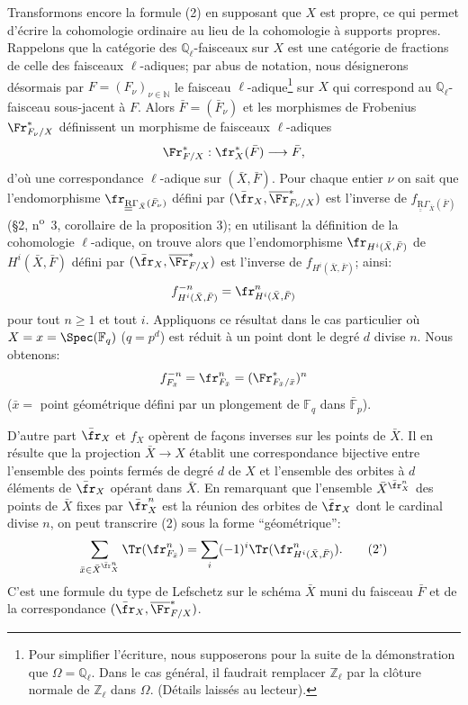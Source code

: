Transformons encore la formule (2) en supposant que $X$ est propre, ce qui permet d'écrire la cohomologie ordinaire au lieu de la cohomologie à supports propres. Rappelons que la catégorie des $\mathbb{Q}_\ell$-faisceaux sur $X$ est une catégorie de fractions de celle des faisceaux $\ell$-adiques; par abus de notation, nous désignerons désormais par $F=(F_\nu)_{\nu\in\mathbb{N}}$ le faisceau $\ell$-adique\footnote{Pour simplifier l'écriture, nous supposerons pour la suite de la démonstration que $\Omega=\mathbb{Q}_\ell$. Dans le cas général, il faudrait remplacer $\mathbb{Z}_\ell$ par la clôture normale de $\mathbb{Z}_\ell$ dans $\Omega$. (Détails laissés au lecteur).} sur $X$ qui correspond au $\mathbb{Q}_\ell$-faisceau sous-jacent à $F$. Alors $\bar F=(\bar F_\nu)$ et les morphismes de Frobenius $\Fr^*_{F_\nu/X}$ définissent un morphisme de faisceaux $\ell$-adiques
\[
\Fr^*_{F/X}:\fr_X^*(\bar F)\longrightarrow\bar F,
\]
d'où une correspondance $\ell$-adique sur $(\bar X,\bar F)$. Pour chaque entier $\nu$ on sait que l'endomorphisme $\fr_{\underline{\underline{\mathrm{R}}}\Gamma_{\bar X}(\bar F_\nu)}$ défini par $(\bar{\fr}_X,\overline{\Fr}^*_{F_\nu/X})$ est l'inverse de $f_{\underline{\underline{\mathrm{R}}}\Gamma_{\bar X}(\bar F)}$ (§2, n\textsuperscript{o}~3, corollaire de la proposition 3); en utilisant la définition de la cohomologie $\ell$-adique, on trouve alors que l'endomorphisme $\fr_{H^i(\bar X,\bar F)}$ de $H^i(\bar X,\bar F)$ défini par $(\bar{\fr}_X,\overline{\Fr}^*_{F/X})$ est l'inverse de $f_{H^i(\bar X,\bar F)}$; ainsi:
\[
f^{-n}_{H^i(\bar X,\bar F)}=\fr^n_{H^i(\bar X,\bar F)}
\]
pour tout $n\ge1$ et tout $i$.
Appliquons ce résultat dans le cas particulier où $X=x=\Spec(\mathbb{F}_q)$ ($q=p^d$) est réduit à un point dont le degré $d$ divise $n$. Nous obtenons:
\[
f^{-n}_{F_{\bar x}}=\fr^n_{F_{\bar x}}=(\Fr^*_{F_{\bar x}/\bar x})^n
\]
($\bar x=$ point
géométrique défini par un plongement de $\mathbb{F}_q$ dans $\bar{\mathbb{F}}_p$).

D'autre part $\bar{\fr}_X$ et $f_X$ opèrent de façons inverses sur les points de $\bar X$. Il en résulte que la projection $\bar X\to X$ établit une correspondance bijective entre l'ensemble des points fermés de degré $d$ de $X$ et l'ensemble des orbites à $d$ éléments de $\bar{\fr}_X$ opérant dans $\bar X$. En remarquant que l'ensemble $\bar X^{\bar{\fr}_X^n}$ des points de $\bar X$ fixes par $\bar{\fr}_X^n$ est la réunion des orbites de $\bar{\fr}_X$ dont le cardinal divise $n$, on peut transcrire (2) sous la forme ``géométrique'':
\[
\sum_{\bar x\in\bar X^{\bar{\fr}_X^n}}\Tr(\fr^n_{F_{\bar x}})
=\sum_i(-1)^i\Tr(\fr^n_{H^i(\bar X,\bar F)}).
\tag{2'}
\]
C'est une formule du type de Lefschetz sur le schéma $\bar X$ muni du faisceau $\bar F$ et de la correspondance $(\bar{\fr}_X,\overline{\Fr}^*_{F/X})$.

